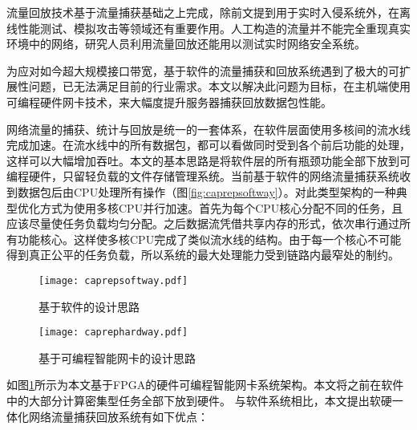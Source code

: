 流量回放技术基于流量捕获基础之上完成，除前文提到用于实时入侵系统外，在离线性能测试、模拟攻击等领域还有重要作用。人工构造的流量并不能完全重现真实环境中的网络，研究人员利用流量回放还能用以测试实时网络安全系统。

为应对如今超大规模接口带宽，基于软件的流量捕获和回放系统遇到了极大的可扩展性问题，已无法满足目前的行业需求。本文以解决此问题为目标，在主机端使用可编程硬件网卡技术，来大幅度提升服务器捕获回放数据包性能。




网络流量的捕获、统计与回放是统一的一套体系，在软件层面使用多核间的流水线完成加速。在流水线中的所有数据包，都可以看做同时受到各个前后功能的处理，这样可以大幅增加吞吐。本文的基本思路是将软件层的所有瓶颈功能全部下放到可编程硬件，只留轻负载的文件存储管理系统。当前基于软件的网络流量捕获系统收到数据包后由CPU处理所有操作（图\ref{fig:caprepsoftway}）。对此类型架构的一种典型优化方式为使用多核CPU并行加速。首先为每个CPU核心分配不同的任务，且应该尽量使任务负载均匀分配。之后数据流凭借共享内存的形式，依次串行通过所有功能核心。这样使多核CPU完成了类似流水线的结构。由于每一个核心不可能得到真正公平的任务负载，所以系统的最大处理能力受到链路内最窄处的制约。



\begin{figure}[htbp]
	\centering 
	\vspace{-1.5mm}
	\begin{minipage}[t]{0.48\textwidth}
		\centering
		\texttt{[image: caprepsoftway.pdf]}
		\caption{基于软件的设计思路} \label{fig:caprepsoftway}
	\end{minipage}
	\begin{minipage}[t]{0.48\textwidth}
		\centering
		\texttt{[image: caprephardway.pdf]}
		\caption{基于可编程智能网卡的设计思路} \label{fig:caprephardway}
	\end{minipage}
\end{figure}

如图\ref{fig:caprephardway}所示为本文基于FPGA的硬件可编程智能网卡系统架构。本文将之前在软件中的大部分计算密集型任务全部下放到硬件。 与软件系统相比，本文提出软硬一体化网络流量捕获回放系统有如下优点：

